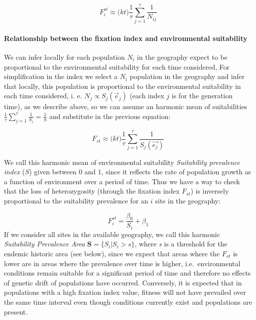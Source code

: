 \documentclass[
]{article}
\begin{document}
\[
F_{i}^{st} \approx \Big (kt\Big)  \frac{1}{\tau}\sum_{j=1}^{\tau}\frac{1}{N_{ij}} 
\]

\hypertarget{relationship-between-the-fixation-index-and-environmental-suitability}{%
\paragraph{Relationship between the fixation index and environmental
suitability}\label{relationship-between-the-fixation-index-and-environmental-suitability}}

We can infer locally for each population \(N_i\) in the geography expect
to be proportional to the environmental suitability for each time
considered, For simplification in the index we select a \(N_i\)
population in the geography and infer that locally, this population is
proportional to the environmental suitability in each time considered,
i. e. \(N_{j} \propto S_{j}(\vec{e}_{j})\) (each index \(j\) is for the
generation time), as we describe above, so we can assume an harmonic mean
of suitabilities
\(\frac{1}{\tau}\sum_{j = 1}^{\tau} \frac{1}{S_j} = \frac{1}{S}\) and
substitute in the previous equation:

\[
F_{st} \approx \Big (kt\Big)  \frac{1}{\tau}\sum_{j=1}^{\tau}\frac{1}{S_j(\vec{e_j})}
\]

We call this harmonic mean of environmental suitability
\emph{Suitability prevalence index }(\(S\)) given between \(0\) and
\(1\), since it reflects the rate of population growth as a function of
environment over a period of time. Thus we have a way to check that the
loss of heterozygosity (through the fixation index \(F_{st}\)) is
inversely proportional to the suitability prevalence for an \(i\) site
in the geography:

\[
F_{i}^{st}= \frac{\beta_0}{S_i} + \beta_1
\] If we consider all sites in the available geography, we call this
harmonic \emph{Suitability Prevalence Area}
\(\mathbf{S} = \{S_i | S_i > s\}\), where \textit{s} is a threshold for the endemic historic area (see below), since we expect that areas where the
\(F_{st}\) is lower are in areas where the prevalence over time is
higher, i.e.~environmental conditions remain suitable for a significant
period of time and therefore no effects of genetic drift of populations
have occurred. Conversely, it is expected that in populations with a
high fixation index value, fitness will not have prevailed over the same
time interval even though conditions currently exist and populations are
present.
\end{document}
